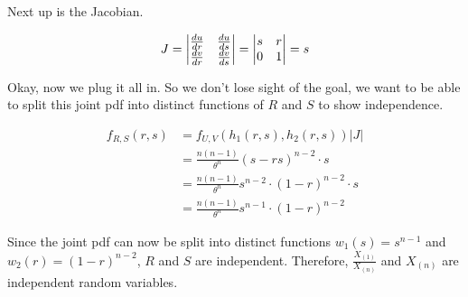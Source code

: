 Next up is the Jacobian.

\[
	J = \m{v}{\frac{du}{dr} & \frac{du}{ds} \\ \frac{dv}{dr} & \frac{dv}{ds}} = \m{v}{s & r \\ 0 & 1} = s
\]

Okay, now we plug it all in. So we don't lose sight of the goal, we want to be able to split this joint pdf into distinct functions of $R$ and $S$ to show independence. 

\begin{align*}
	f_{R,S}(r,s) &= f_{U,V}(h_{1}(r,s), h_2(r,s)) |J| \\
	&= \frac{n(n-1)}{\theta^n} (s-rs)^{n-2} \cdot s \\
	&= \frac{n(n-1)}{\theta^n} s^{n-2} \cdot (1-r)^{n-2} \cdot s \\
	&= \frac{n(n-1)}{\theta^n} s^{n-1} \cdot (1-r)^{n-2} 
\end{align*}

Since the joint pdf can now be split into distinct functions $w_1(s) = s^{n-1}$ and $w_2(r) = (1-r)^{n-2}$, $R$ and $S$ are independent. Therefore, $\frac{X_{(1)}}{X_{(n)}}$ and $X_{(n)}$ are independent random variables.
